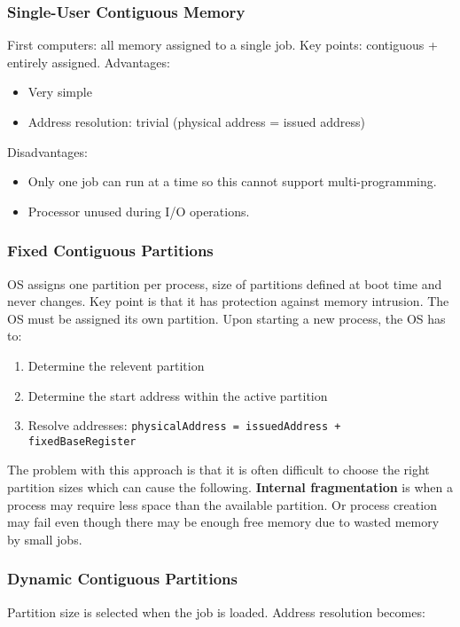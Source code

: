 \documentclass{article}%
\begin{document}
\subsubsection{Single-User Contiguous Memory}
\label{sec:org202f26e}
First computers: all memory assigned to a single job.
Key points: contiguous + entirely assigned.
Advantages:
\begin{itemize}
\item Very simple
\item Address resolution: trivial (physical address = issued address)
\end{itemize}
Disadvantages:
\begin{itemize}
\item Only one job can run at a time so this cannot support multi-programming.
\item Processor unused during I/O operations.
\end{itemize}

\subsubsection{Fixed Contiguous Partitions}
\label{sec:org17342b3}
OS assigns one partition per process, size of partitions defined at boot time and never changes.
Key point is that it has protection against memory intrusion.
The OS must be assigned its own partition.
Upon starting a new process, the OS has to:
\begin{enumerate}
\item Determine the relevent partition
\item Determine the start address within the active partition
\item Resolve addresses: \texttt{physicalAddress = issuedAddress + fixedBaseRegister}
\end{enumerate}
The problem with this approach is that it is often difficult to choose the right partition sizes which can cause the following.
\textbf{Internal fragmentation} is when a process may require less space than the available partition.
Or process creation may fail even though there may be enough free memory due to wasted memory by small jobs.

\subsubsection{Dynamic Contiguous Partitions}
\label{sec:org7677b29}
Partition size is selected when the job is loaded.
Address resolution becomes: 
\end{document}
